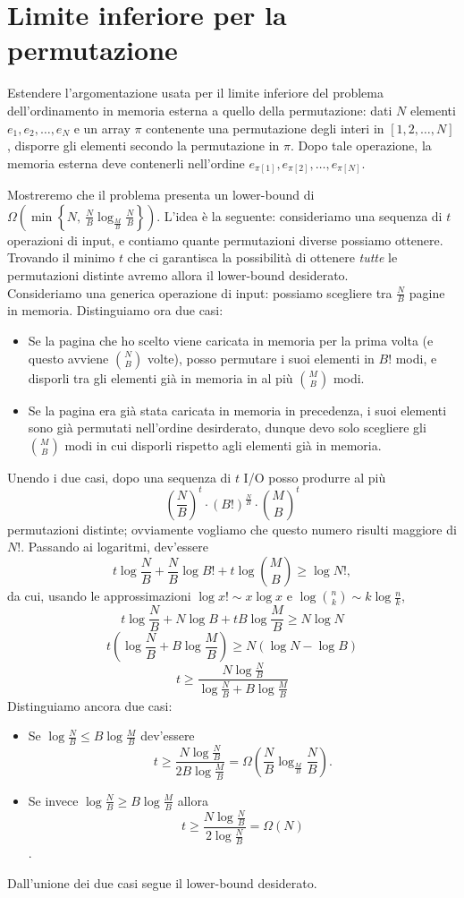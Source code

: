 \chapter{Limite inferiore per la permutazione}

\begin{problem*}
    Estendere l'argomentazione usata per il limite inferiore del problema 
    dell'ordinamento in memoria esterna a quello della permutazione: dati
    \(N\) elementi \(e_1,e_2,\dots ,e_N\) e un array \(\pi\) contenente
    una permutazione degli interi in \([1,2,\dots ,N]\), disporre gli
    elementi secondo la permutazione in \(\pi\). Dopo tale operazione,
    la memoria esterna deve contenerli nell'ordine
    \(e_{\pi[1]},e_{\pi[2]},\dots ,e_{\pi[N]}\).
\end{problem*}

Mostreremo che il problema presenta un lower-bound di $\displaystyle\Omega\left(\min\left\{N,~\frac{N}{B}\log_{\frac{M}{B}}\frac{N}{B}\right\}\right)$.
L'idea è la seguente: consideriamo una sequenza di $t$ operazioni di input, e contiamo quante permutazioni diverse possiamo ottenere. Trovando il minimo $t$ che ci garantisca la possibilità di ottenere \textit{tutte} le permutazioni distinte avremo allora il lower-bound desiderato.\[\]
Consideriamo una generica operazione di input: possiamo scegliere tra $\frac{N}{B}$ pagine in memoria. Distinguiamo ora due casi:
\begin{itemize}
\item Se la pagina che ho scelto viene caricata in memoria per la prima volta (e questo avviene $N \choose B$ volte), posso permutare i suoi elementi in $B!$ modi, e disporli tra gli elementi già in memoria in al più $M\choose{B}$ modi.
\item Se la pagina era già stata caricata in memoria in precedenza, i suoi elementi sono già permutati nell'ordine desirderato, dunque devo solo scegliere gli $M\choose B$ modi in cui disporli rispetto agli elementi già in memoria.
\end{itemize}
Unendo i due casi, dopo una sequenza di $t$ I/O posso produrre al più \[\left(\frac{N}{B}\right)^t\cdot(B!)^\frac{N}{B}\cdot {M\choose B}^t\] permutazioni distinte; ovviamente vogliamo che questo numero risulti maggiore di $N!$. Passando ai logaritmi, dev'essere \[t\log \frac{N}{B} + \frac{N}{B}\log B! + t\log {M\choose B} \ge \log N!,\]da cui, usando le approssimazioni $\log x! \sim x\log x$ e $\log{n\choose k} \sim k\log\frac{n}{k}$, \[t\log \frac{N}{B} + N\log B + tB\log\frac{M}{B} \ge N\log N\]\[t\left(\log \frac{N}{B} + B\log\frac{M}{B}\right)\ge N(\log N-\log B)\]\[t\ge\frac{N\log\frac{N}{B}}{\log \frac{N}{B} + B\log\frac{M}{B}}\]
Distinguiamo ancora due casi:
\begin{itemize}
\item Se $\log \frac{N}{B} \le B \log\frac{M}{B}$ dev'essere \[\displaystyle t \ge \frac{N \log \frac{N}{B}}{2B\log\frac{M}{B}}=\Omega\left(\frac{N}{B}\log_{\frac{M}{B}}\frac{N}{B}\right).\]
\item Se invece $\log \frac{N}{B} \ge B\log\frac{M}{B}$ allora \[t\ge\frac{N\log\frac{N}{B}}{2\log \frac{N}{B}}=\Omega(N)\].
\end{itemize}
Dall'unione dei due casi segue il lower-bound desiderato. 
